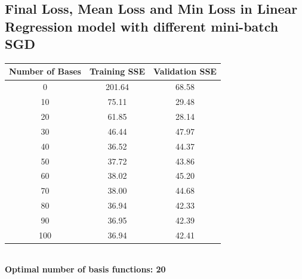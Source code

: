 \documentclass{article}
\begin{document}
\begin{appendices}
\subsection{Final Loss, Mean Loss and Min Loss in Linear Regression model with different mini-batch SGD} \label{app:loss-history-sgd-log}
\begin{minipage}{0.45\textwidth}  %
        \centering
        \begin{tabular}{|c|c|c|}
            \hline
            {Number of Bases} & {Training SSE} & {Validation SSE} \\
            \hline
             0  & 201.64  & 68.58  \\
            10  &  75.11  & 29.48  \\
            20  &  61.85  & 28.14  \\
            30  &  46.44  & 47.97  \\
            40  &  36.52  & 44.37  \\
            50  &  37.72  & 43.86  \\
            60  &  38.02  & 45.20  \\
            70  &  38.00  & 44.68  \\
            80  &  36.94  & 42.33  \\
            90  &  36.95  & 42.39  \\
           100  &  36.94  & 42.41  \\
            \hline
        \end{tabular}\\
        \vspace{0.3cm}
        \textbf{Optimal number of basis functions: 20}
        \label{SSE_table}
    \end{minipage}


\end{appendices}
\end{document}
